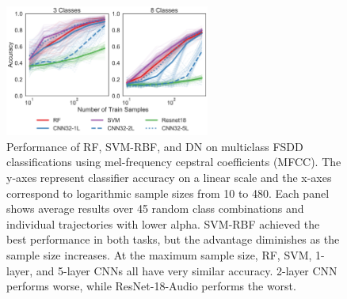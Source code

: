 \begin{figure}[!htb]
\centering
\includegraphics[width=0.6\textwidth]{figures/mfcc.pdf}
  \caption{Performance of RF, SVM-RBF, and DN on multiclass FSDD classifications using mel-frequency cepstral coefficients (MFCC). 
  The y-axes represent classifier accuracy on a linear scale and the x-axes correspond to logarithmic sample sizes from 10 to 480. Each panel shows average results over 45 random class combinations and individual trajectories with lower alpha.
  SVM-RBF achieved the best performance in both tasks, but the advantage diminishes as the sample size increases. At the maximum sample size, RF, SVM, 1-layer, and 5-layer CNNs all have very similar accuracy. 2-layer CNN performs worse, while ResNet-18-Audio performs the worst.
  }
\label{fig:mfcc}
\end{figure}
\vfil\eject